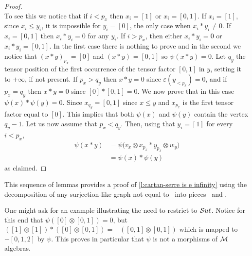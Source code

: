 \begin{proof}
\[	\]
	To see this we notice that if $i < p_x$ then $x_i = [1]$ or $x_i = [0,1]$.
	If $x_i = [1]$, since $x_i \leq y_i$, it is impossible for $y_i = [0]$, the only case when $x_i \ast y_i \neq 0$.
	If $x_i = [0,1]$ then $x_i \ast y_i = 0$ for any $y_i$.
	If $i > p_x$, then either $x_i \ast y_i = 0$ or $x_i \ast y_i = [0,1]$.
	In the first case there is nothing to prove and in the second we notice that $(x \ast y)_{p_x} = [0]$ and $(x \ast y)_{} = [0,1]$ so $\psi(x \ast y) = 0$.
	Let $q_y$ the tensor position of the first occurrence of the tensor factor $[0,1]$ in $y$, setting it to $+\infty$, if not present.
	If $p_x > q_y$ then $x \ast y = 0$ since $\varepsilon(y_{<p_x}) = 0$, and if $p_x = q_y$ then $x \ast y = 0$ since $[0] \ast [0,1] = 0$.
	We now prove that in this case $\psi(x) \ast \psi(y) = 0$.
	Since $x_{q_y} = [0,1]$ since $x \leq y$ and $x_{p_x}$ is the first tensor factor equal to $[0]$.
	This implies that both $\psi(x)$ and $\psi(y)$ contain the vertex $q_{y} - 1$.
	Let us now assume that $p_x < q_y$.
	Then, using that $y_i = [1]$ for every $i < p_x$,
	\begin{align*}
	\psi(x \ast y) & =
	\psi \big( v_x \otimes x_{p_x} \ast y_{p_x} \otimes w_y \big) \\ & =
	\psi(x) \ast \psi(y)
	\end{align*}
	as claimed.
\end{proof}

This sequence of lemmas provides a proof of \cref{l:cartan-serre is e infinity} using the decomposition of any surjection-like graph not equal to \counit \ into pieces \coproduct \ and \product.

\begin{remark}
	One might ask for an example illustrating the need to restrict to $\mathcal{S}u\ell$.
	Notice for this end that $\psi([0] \otimes [0,1]) = 0$, but $([1] \otimes [1]) \ast ([0] \otimes [0,1]) = -([0,1] \otimes [0,1])$ which is mapped to $-[0,1,2]$ by $\psi$.
	This proves in particular that $\psi$ is not a morphisms of $\mathcal{M}$ algebras.
\end{remark}